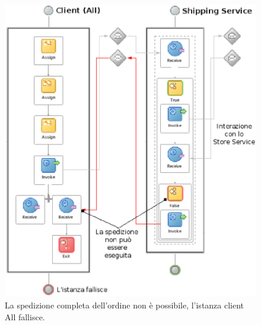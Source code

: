 \begin{figure}[p]
\begin{center}
  \includegraphics[scale=0.85,clip]{blide/dia/Sim2}
   \caption[Blide, simulazione 2]{La spedizione completa dell'ordine
   non è possibile, l'istanza client All fallisce.}
  \label{fig:Sim2}
\end{center}
\end{figure}

